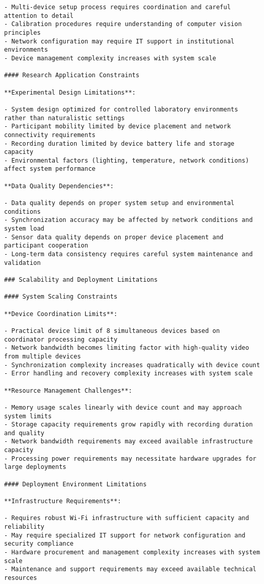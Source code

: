 \documentclass[12pt,a4paper]{report}
\begin{document}
\begin{verbatim}
- Multi-device setup process requires coordination and careful attention to detail
- Calibration procedures require understanding of computer vision principles
- Network configuration may require IT support in institutional environments
- Device management complexity increases with system scale

#### Research Application Constraints

**Experimental Design Limitations**:

- System design optimized for controlled laboratory environments rather than naturalistic settings
- Participant mobility limited by device placement and network connectivity requirements
- Recording duration limited by device battery life and storage capacity
- Environmental factors (lighting, temperature, network conditions) affect system performance

**Data Quality Dependencies**:

- Data quality depends on proper system setup and environmental conditions
- Synchronization accuracy may be affected by network conditions and system load
- Sensor data quality depends on proper device placement and participant cooperation
- Long-term data consistency requires careful system maintenance and validation

### Scalability and Deployment Limitations

#### System Scaling Constraints

**Device Coordination Limits**:

- Practical device limit of 8 simultaneous devices based on coordinator processing capacity
- Network bandwidth becomes limiting factor with high-quality video from multiple devices
- Synchronization complexity increases quadratically with device count
- Error handling and recovery complexity increases with system scale

**Resource Management Challenges**:

- Memory usage scales linearly with device count and may approach system limits
- Storage capacity requirements grow rapidly with recording duration and quality
- Network bandwidth requirements may exceed available infrastructure capacity
- Processing power requirements may necessitate hardware upgrades for large deployments

#### Deployment Environment Limitations

**Infrastructure Requirements**:

- Requires robust Wi-Fi infrastructure with sufficient capacity and reliability
- May require specialized IT support for network configuration and security compliance
- Hardware procurement and management complexity increases with system scale
- Maintenance and support requirements may exceed available technical resources


\end{verbatim}
\end{document}
